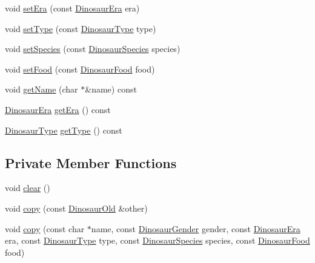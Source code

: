 \begin{DoxyCompactItemize}
\item 
void \hyperlink{classDinosaurOld_a679b68bb5d0b02e318153fe95702bedc}{set\+Era} (const \hyperlink{DinosaurOld_8hpp_aa47f0b0878c65fb93dcaf8fde26dfaa5}{Dinosaur\+Era} era)
\item 
void \hyperlink{classDinosaurOld_a4161301ad916d20df5d37b2c2d6a48a2}{set\+Type} (const \hyperlink{DinosaurOld_8hpp_a9f8d7b1c3f7b7d03f4101875fa35e8ea}{Dinosaur\+Type} type)
\item 
void \hyperlink{classDinosaurOld_afc06be1c0593e50917b750eb9b92afa8}{set\+Species} (const \hyperlink{DinosaurOld_8hpp_aef2140b5b57464fa283af86adcd6c5c1}{Dinosaur\+Species} species)
\item 
void \hyperlink{classDinosaurOld_aba3d1b4310b1e3dce3b04060e5aad032}{set\+Food} (const \hyperlink{DinosaurOld_8hpp_aeeb0837497c35a4ebbceb4e9386909f8}{Dinosaur\+Food} food)
\item 
void \hyperlink{classDinosaurOld_acb54cb1a47c3211993f4f45f083d6f29}{get\+Name} (char $\ast$\&name) const
\item 
\hyperlink{DinosaurOld_8hpp_aa47f0b0878c65fb93dcaf8fde26dfaa5}{Dinosaur\+Era} \hyperlink{classDinosaurOld_aa6f90f6e778afdceca54b29f57b2985b}{get\+Era} () const
\item 
\hyperlink{DinosaurOld_8hpp_a9f8d7b1c3f7b7d03f4101875fa35e8ea}{Dinosaur\+Type} \hyperlink{classDinosaurOld_a4e81fc884eded2c8298abbcd080bc5df}{get\+Type} () const
\end{DoxyCompactItemize}
\subsection*{Private Member Functions}
\begin{DoxyCompactItemize}
\item 
void \hyperlink{classDinosaurOld_a6b66361d0bf89eaaaf4058bd5d578a2a}{clear} ()
\item 
void \hyperlink{classDinosaurOld_aa0cbaaaacd72099602180898b1634593}{copy} (const \hyperlink{classDinosaurOld}{Dinosaur\+Old} \&other)
\item 
void \hyperlink{classDinosaurOld_a195a54fea769555f0a057f80438dbe6b}{copy} (const char $\ast$name, const \hyperlink{DinosaurOld_8hpp_a98f70ab69c44631b0efc003a2c9b3d30}{Dinosaur\+Gender} gender, const \hyperlink{DinosaurOld_8hpp_aa47f0b0878c65fb93dcaf8fde26dfaa5}{Dinosaur\+Era} era, const \hyperlink{DinosaurOld_8hpp_a9f8d7b1c3f7b7d03f4101875fa35e8ea}{Dinosaur\+Type} type, const \hyperlink{DinosaurOld_8hpp_aef2140b5b57464fa283af86adcd6c5c1}{Dinosaur\+Species} species, const \hyperlink{DinosaurOld_8hpp_aeeb0837497c35a4ebbceb4e9386909f8}{Dinosaur\+Food} food)
\end{DoxyCompactItemize}
